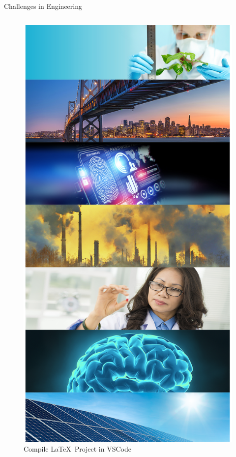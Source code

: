 \documentclass[xcolor={dvipsnames},aspectratio=169,10pt]{beamer}
\begin{document}
\begin{frame}{Challenges in Engineering}
\begin{columns}
\begin{column}{.3\linewidth}
      \begin{figure}
        \centering
        \includegraphics[scale=0.1]{./figs/challenges/versions/drawing.png}
        \caption{Compile \LaTeX~Project in VSCode}
      \end{figure}
 
 
    \end{column}
  \end{columns}

\end{frame}
\end{document}
